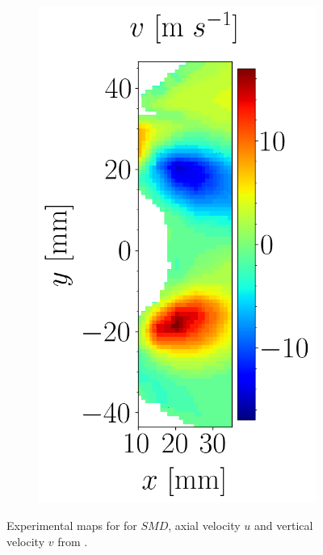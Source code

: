 \begin{figure}[h!]
\begin{subfigure}[b]{0.3\textwidth}
	\centering
   \includegraphics[scale=0.4]{./part3_applications/figures_ch9_lagrangian/expe_maps/u_vertical_map.png}
\end{subfigure}
\caption{Experimental maps for for $SMD$, axial velocity $u$ and vertical velocity $v$ from .}
\label{fig:maps_BIMER_renaud_expe_results}
\end{figure}

